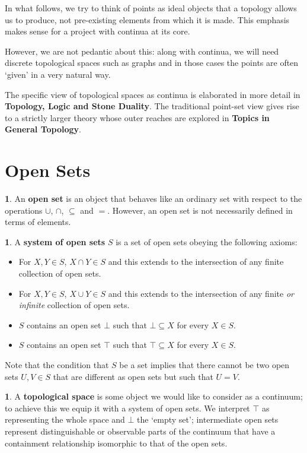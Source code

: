 \documentclass[oneside,english]{amsbook}
\numberwithin{section}{chapter}
\theoremstyle{plain}
\theoremstyle{definition}
\newtheorem{defn}[thm]{\protect\definitionname}
\providecommand{\definitionname}{Definition}
\begin{document}
In what follows, we try to think of points as ideal objects that a topology allows us to produce, not pre-existing elements from which it is made. This emphasis makes sense for a project with continua at its core. 

However, we are not pedantic about this: along with continua, we will need discrete topological spaces such as graphs and in those cases the points are often `given' in a very natural way.

The specific view of topological spaces as continua is elaborated in more detail in \textbf{Topology, Logic and Stone Duality}. The traditional point-set view gives rise to a strictly larger theory whose outer reaches are explored in \textbf{Topics in General Topology}.

\section{Open Sets}

\begin{defn} 
	An \textbf{open set} is an object that behaves like an ordinary set with respect to the operations $\cup$, $\cap$, $\subseteq$ and $=$. However, an open set is not necessarily defined in terms of elements.
\end{defn} 

\begin{defn} 
	A \textbf{system of open sets} $S$ is a set of open sets obeying the following axioms:
	\begin{itemize}
		\item For $X, Y\in S$, $X\cap Y\in S$ and this extends to the intersection of any finite collection of open sets.
		\item For $X, Y\in S$, $X\cup Y\in S$ and this extends to the intersection of any finite \textit{or infinite} collection of open sets.
		\item $S$ contains an open set $\bot$ such that $\bot\subseteq X$ for every $X\in S$.
		\item $S$ contains an open set $\top$ such that $\top\subseteq X$ for every $X\in S$.
	\end{itemize}
\end{defn} 

Note that the condition that $S$ be a set implies that there cannot be two open sets $U, V\in S$ that are different as open sets but such that $U = V$. 

\begin{defn} 
	A \textbf{topological space} is some object we would like to consider as a continuum; to achieve this we equip it with a system of open sets. We interpret $\top$ as representing the whole space and $\bot$ the `empty set'; intermediate open sets represent distinguishable or observable parts of the continuum that have a containment relationship isomorphic to that of the open sets.
\end{defn} 
\end{document}
